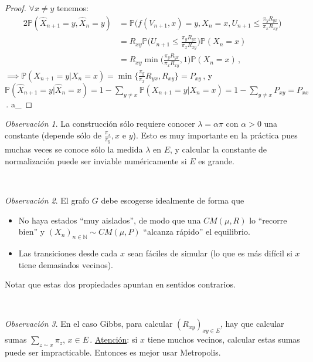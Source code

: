\documentclass[letterpaper,11pt]{article} %
\theoremstyle{defbreak}
\theoremstyle{propbreak}
\theoremstyle{remark}
\newtheorem{remark}{Observación}[subsection]
\theoremstyle{break}
\def\P{\mathbb{P}}
\def\N{\mathbb{N}}
\def\gris{\color{mygray}}
\def\negro{\color{black}}
\def\findem{\null\hfill\color{white}a\color{black}_\square}
\def\xhat{\hat{X}}
\begin{document}
\begin{proof}
\gris
$\forall x\neq y$ tenemos:
\begin{alignat*}{2}
    \P(\xhat_{n+1}=y,\xhat_{n}=y) & = \P\bigg(f(V_{n+1},x)=y,X_n=x,U_{n+1}\leq \displaystyle\frac{\pi_y R_{yx}}{\pi_x R_{xy}}\bigg) \\
     & = R_{xy}\P\bigg(U_{n+1}\leq \frac{\pi_y R_{yx}}{\pi_x R_{xy}}\bigg)\P(X_n=x)\\
     & = R_{xy}\min\bigg(\frac{\pi_y R_{yx}}{\pi_x R_{xy}},1\bigg)\P(X_n=x) \,,
\end{alignat*}
$\implies \P(X_{n+1}=y| X_n=x)=\displaystyle\min\{\frac{\pi_y}{\pi_x}R_{yx},R_{xy}\}=P_{xy}$\,,
\newline y $\P(\xhat_{n+1}=y|\xhat_{n}=x)=1-\displaystyle\sum_{y\neq x}\P(X_{n+1}=y|X_n=x)=1-\sum_{y\neq x}P_{xy}=P_{xx}$\,. \findem
\negro
\end{proof}
\begin{remark}
La construcción sólo requiere conocer $\lambda = \alpha \pi$ con $\alpha>0$ una constante (depende sólo de $\displaystyle \frac{\pi_x}{\pi_y},x$ e $y$). %
Esto es muy importante en la práctica pues muchas veces se conoce sólo la medida $\lambda$ en $E$, y calcular la constante de normalización puede ser inviable numéricamente si $E$ es grande.
\end{remark}
\vspace{.5cm} \\ %
\begin{remark}
El grafo $G$ debe escogerse idealmente de forma que
\begin{itemize}
    \item No haya estados ``muy aislados'', de modo que una $CM(\mu,R)$ lo ``recorre bien'' y $(X_n)_{n\in\N}\sim CM(\mu,P)$ ``alcanza rápido'' el equilibrio.
    \item Las transiciones desde cada $x$ sean fáciles de simular (lo que es m\'as difícil si $x$ tiene demasiados vecinos).
\end{itemize}
Notar que estas dos propiedades apuntan  en sentidos contrarios.
\end{remark}
\vspace{.5cm} \\ %
\begin{remark}  %
En el caso Gibbs,  para calcular $(R_{xy})_{xy\in E}$, hay que calcular sumas $\sum_{z\sim x}\pi_z$, $x\in E$\,.
    \newline \underline{Atención}: si $x$ tiene muchos vecinos, calcular estas sumas puede ser impracticable. Entonces es mejor usar Metropolis.
\end{remark}
\end{document}

